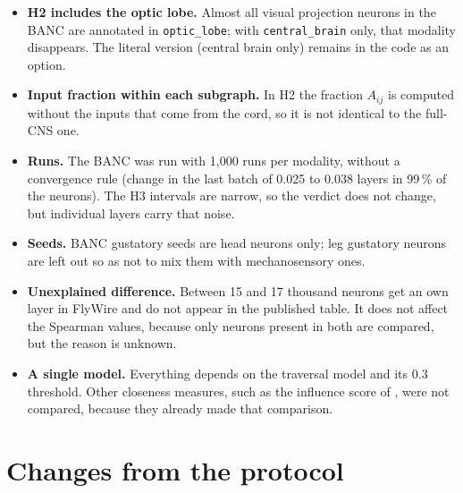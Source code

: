 \documentclass[11pt,letterpaper]{article}
\begin{document}
\begin{itemize}
  \item \textbf{H2 includes the optic lobe.} Almost all visual projection neurons in the BANC are annotated in \texttt{optic\_lobe}; with \texttt{central\_brain} only, that modality disappears. The literal version (central brain only) remains in the code as an option.
  \item \textbf{Input fraction within each subgraph.} In H2 the fraction $A_{ij}$ is computed without the inputs that come from the cord, so it is not identical to the full-CNS one.
  \item \textbf{Runs.} The BANC was run with 1{,}000 runs per modality, without a convergence rule (change in the last batch of 0.025 to 0.038 layers in 99\,\% of the neurons). The H3 intervals are narrow, so the verdict does not change, but individual layers carry that noise.
  \item \textbf{Seeds.} BANC gustatory seeds are head neurons only; leg gustatory neurons are left out so as not to mix them with mechanosensory ones.
  \item \textbf{Unexplained difference.} Between 15 and 17 thousand neurons get an own layer in FlyWire and do not appear in the published table. It does not affect the Spearman values, because only neurons present in both are compared, but the reason is unknown.
  \item \textbf{A single model.} Everything depends on the traversal model and its 0.3 threshold. Other closeness measures, such as the influence score of \citet{bates2026}, were not compared, because they already made that comparison.
\end{itemize}

\section{Changes from the protocol}
\end{document}
